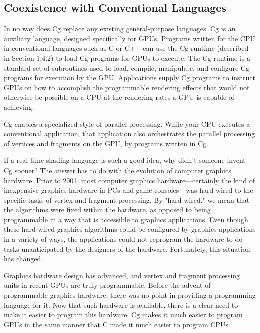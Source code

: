 \documentclass{book}
\begin{document}
\subsection{Coexistence with Conventional Languages}

In no way does Cg replace any existing general-purpose languages. Cg is an auxiliary language, designed specifically for GPUs. Programs written for the CPU in conventional languages such as C or C++ can use the Cg runtime (described in Section 1.4.2) to load Cg programs for GPUs to execute. The Cg runtime is a standard set of subroutines used to load, compile, manipulate, and configure Cg programs for execution by the GPU. Applications supply Cg programs to instruct GPUs on how to accomplish the programmable rendering effects that would not otherwise be possible on a CPU at the rendering rates a GPU is capable of achieving.

Cg enables a specialized style of parallel processing. While your CPU executes a conventional application, that application also orchestrates the parallel processing of vertices and fragments on the GPU, by programs written in Cg.

If a real-time shading language is such a good idea, why didn't someone invent Cg sooner? The answer has to do with the evolution of computer graphics hardware. Prior to 2001, most computer graphics hardware—certainly the kind of inexpensive graphics hardware in PCs and game consoles—was hard-wired to the specific tasks of vertex and fragment processing. By "hard-wired," we mean that the algorithms were fixed within the hardware, as opposed to being programmable in a way that is accessible to graphics applications. Even though these hard-wired graphics algorithms could be configured by graphics applications in a variety of ways, the applications could not reprogram the hardware to do tasks unanticipated by the designers of the hardware. Fortunately, this situation has changed.

Graphics hardware design has advanced, and vertex and fragment processing units in recent GPUs are truly programmable. Before the advent of programmable graphics hardware, there was no point in providing a programming language for it. Now that such hardware is available, there is a clear need to make it easier to program this hardware. Cg makes it much easier to program GPUs in the same manner that C made it much easier to program CPUs.
\end{document}
